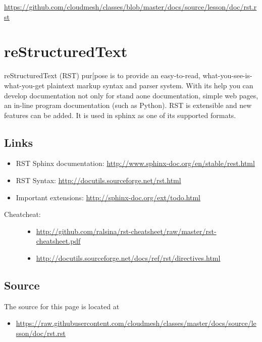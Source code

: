 \begin{fileremark}\url{https://github.com/cloudmesh/classes/blob/master/docs/source/lesson/doc/rst.rst}\end{fileremark}
\section{reStructuredText}\label{restructuredtext}

reStructuredText (RST) pur{[}pose is to provide an easy-to-read,
what-you-see-is-what-you-get plaintext markup syntax and parser system.
With its help you can develop documentation not only for stand aone
documentation, simple web pages, an in-line program documentation (such
as Python). RST is extensible and new features can be added. It is used
in sphinx as one of its supported formats.

\subsection{Links}\label{links}

\begin{itemize}
\tightlist
\item
  RST Sphinx documentation:
  \url{http://www.sphinx-doc.org/en/stable/rest.html}
\item
  RST Syntax: \url{http://docutils.sourceforge.net/rst.html}
\item
  Important extensions: \url{http://sphinx-doc.org/ext/todo.html}
\end{itemize}

\begin{description}
\item[Cheatcheat:]
\begin{itemize}
\tightlist
\item
  \url{http://github.com/ralsina/rst-cheatsheet/raw/master/rst-cheatsheet.pdf}
\item
  \url{http://docutils.sourceforge.net/docs/ref/rst/directives.html}
\end{itemize}
\end{description}

\subsection{Source}\label{source}

The source for this page is located at

\begin{itemize}
\tightlist
\item
  \url{https://raw.githubusercontent.com/cloudmesh/classes/master/docs/source/lesson/doc/rst.rst}
\end{itemize}

